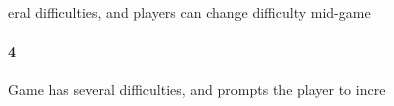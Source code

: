 eral difficulties, and players can change difficulty mid-game\paragraph{4}Game has several difficulties, and prompts the player to incre